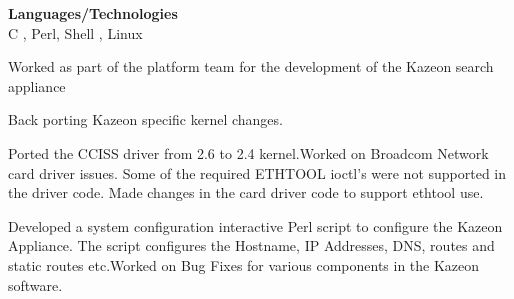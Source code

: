 \documentclass[a4,10pt]{cv4tw}
\begin{document}
                                                        {\textbf{Languages/Technologies} \\ C , Perl, Shell , Linux}
                                                        {
                                                            \begin{missions}
                                                            \item Worked as part of the platform team for the development of the Kazeon search appliance
                                                            \item Back porting Kazeon specific kernel changes.
                                                            \item Ported the CCISS driver from 2.6 to 2.4 kernel.Worked on Broadcom Network card driver issues. Some of the required ETHTOOL ioctl's were not supported in the driver code. Made changes in the card driver code to support ethtool use.
                                                            \item Developed a  system configuration interactive Perl script to configure the Kazeon Appliance. The script configures the Hostname, IP Addresses, DNS, routes and static routes etc.Worked on Bug Fixes for various components in the Kazeon software.
                                                            \end{missions}
                                                            }
\end{document}
